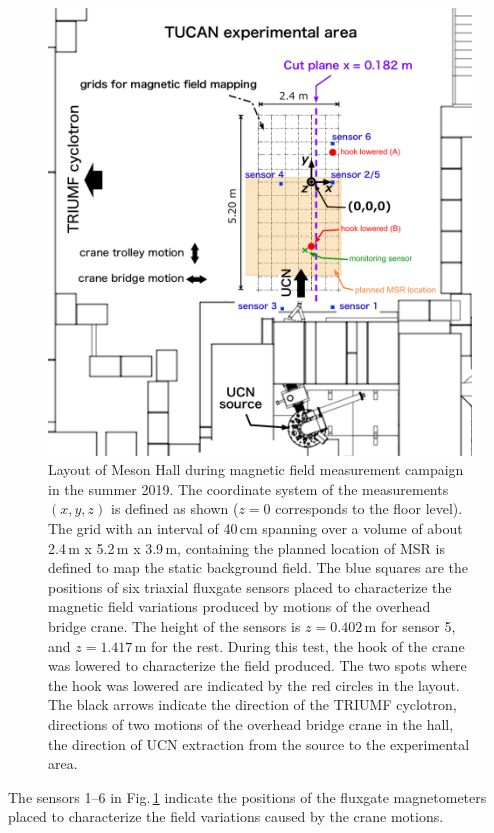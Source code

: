  \begin{figure}[htb!]
   \centering
   \includegraphics[width=.9\textwidth]{graphics/AMC/Layout_CDR.pdf}
   \caption{Layout of Meson Hall during magnetic field measurement campaign in the summer 2019. The coordinate system of the measurements $(x,y,z)$ is defined as shown ($z=0$ corresponds to the floor level).
   The grid with an interval of 40\,cm spanning over a volume of about 2.4\,m x 5.2\,m x 3.9\,m, containing the planned location of MSR is defined to map the static background field. The blue squares are the positions of six triaxial fluxgate sensors placed to characterize the magnetic field variations produced by motions of the overhead bridge crane. The height of the sensors is $z=0.402$\,m for sensor 5, and $z=1.417$\,m for the rest. During this test, the hook of the crane was lowered to characterize the field produced. The two spots where the hook was lowered are indicated by the red circles in the layout.
   The black arrows indicate the direction of the TRIUMF cyclotron, directions of two motions of the overhead bridge crane in the hall, the direction of UCN extraction from the source to the experimental area. }
   \label{fig:amc_layout}
 \end{figure}
 The sensors 1--6 in Fig.\,\ref{fig:amc_layout} indicate the positions of the fluxgate magnetometers placed to characterize the field variations caused by the crane motions. 
